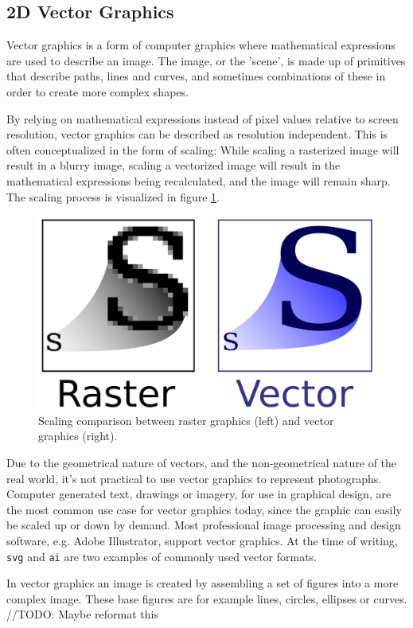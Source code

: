 \subsection{2D Vector Graphics}
Vector graphics is a form of computer graphics where mathematical expressions are used to describe an image.
The image, or the 'scene', is made up of primitives that describe paths, lines and curves, and sometimes combinations of these in order to create more complex shapes.

By relying on mathematical expressions instead of pixel values relative to screen resolution, vector graphics can be described as resolution independent.
This is often conceptualized in the form of scaling:
While scaling a rasterized image will result in a blurry image, scaling a vectorized image will result in the mathematical expressions being recalculated, and the image will remain sharp.
The scaling process is visualized in figure \ref{fig:vectorscaling}.

\begin{figure}[h!]
\centering \includegraphics[width=0.5\linewidth]{images/bm_vs_svg.png}
\caption{Scaling comparison between raster graphics (left) and vector graphics (right)\cite{svg}.}
\label{fig:vectorscaling}
\end{figure}

Due to the geometrical nature of vectors, and the non-geometrical nature of the real world, it's not practical to use vector graphics to represent photographs.
Computer generated text, drawings or imagery, for use in graphical design, are the most common use case for vector graphics today, since the graphic can easily be scaled up or down by demand.
Most professional image processing and design software, e.g. Adobe Illustrator, support vector graphics.
At the time of writing, \texttt{svg} and \texttt{ai} are two examples of commonly used vector formats.

In vector graphics an image is created by assembling a set of figures into a more complex image.
These base figures are for example lines, circles, ellipses or curves. //TODO: Maybe reformat this

